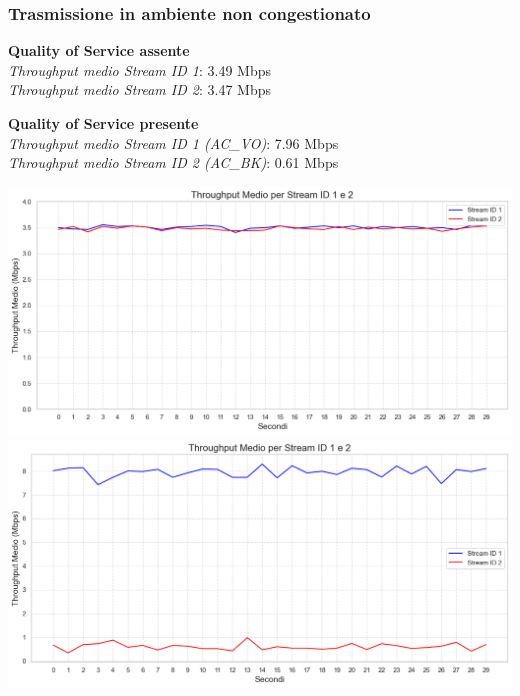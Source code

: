 \documentclass{beamer}
\begin{document}
\begin{frame}
    \frametitle{Trasmissione in ambiente non congestionato}
    
    \begin{minipage}{0.45\textwidth}
        \textbf{Quality of Service assente}\\
        \textit{Throughput medio Stream ID 1}: 3.49 Mbps\\
        \textit{Throughput medio Stream ID 2}: 3.47 Mbps\\
        \vspace{1cm}
        
        \textbf{Quality of Service presente}\\
        \textit{Throughput medio Stream ID 1 (AC\_VO)}: 7.96 Mbps\\
        \textit{Throughput medio Stream ID 2 (AC\_BK)}: 0.61 Mbps\\
    \end{minipage}
    \hfill
    \begin{minipage}{0.5\textwidth}
        \centering
        \includegraphics[width=\textwidth]{t1_c0_main.png} %
        \vspace{1cm}
        \includegraphics[width=\textwidth]{t2_c0_main.png} %
    \end{minipage}

\end{frame}
\end{document}
